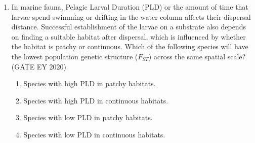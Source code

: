 \begin{enumerate}
\begin{quote}
P. The islands are of the same size and are at the same distance from the mainland.\\
Q. The islands are of different sizes and are at the same distance from the mainland.\\
R. The islands are of the same size and are at different distances from the mainland.\\
S. The islands are of different sizes and are of different distances from the mainland.
\end{quote}

\begin{multicols}{2}
\begin{enumerate}
\item Only P.
\item Only Q.
\item Both P and S.
\item Both Q and R.
\end{enumerate}
\end{multicols}

\item In marine fauna, Pelagic Larval Duration (PLD) or the amount of time that larvae spend swimming or drifting in the water column affects their dispersal distance. Successful establishment of the larvae on a substrate also depends on finding a suitable habitat after dispersal, which is influenced by whether the habitat is patchy or continuous. Which of the following species will have the lowest population genetic structure ($F_{ST}$) across the same spatial scale? \hfill {(GATE EY 2020)}

\begin{multicols}{2}
\begin{enumerate}
\item Species with high PLD in patchy habitats.
\item Species with high PLD in continuous habitats.
\item Species with low PLD in patchy habitats.
\item Species with low PLD in continuous habitats.
\end{enumerate}
\end{multicols}


\end{enumerate}
